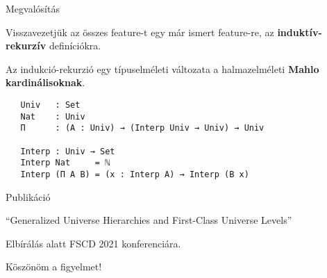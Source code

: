 \documentclass[dvipsnames,10pt,aspectratio=169]{beamer}
\begin{document}
\begin{frame}[fragile]{Megvalósítás}

Visszavezetjük az összes feature-t egy már ismert feature-re,
az \textbf{induktív-rekurzív} definíciókra.
\vspace{1em}

Az indukció-rekurzió egy típuselméleti változata a halmazelméleti \textbf{Mahlo kardinálisoknak}.

\begin{verbatim}
   Univ   : Set
   Nat    : Univ
   Π      : (A : Univ) → (Interp Univ → Univ) → Univ

   Interp : Univ → Set
   Interp Nat     = ℕ
   Interp (Π A B) = (x : Interp A) → Interp (B x)
\end{verbatim}

\end{frame}


\begin{frame}{Publikáció}

``Generalized Universe Hierarchies and First-Class Universe Levels''
\vspace{1em}

Elbírálás alatt FSCD 2021 konferenciára.



\end{frame}

\begin{frame}

\begin{center} {\large Köszönöm a figyelmet!} \end{center}

\end{frame}

\end{document}
